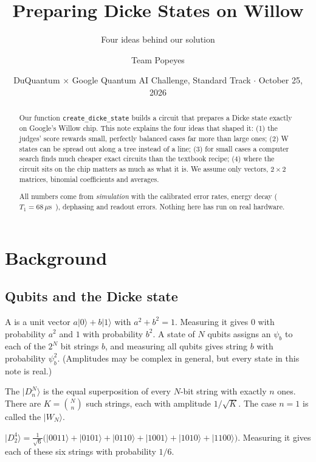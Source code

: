 \documentclass[11pt]{scrartcl}
\title{Preparing Dicke States on Willow}
\subtitle{Four ideas behind our solution}
\author{Team Popeyes}
\date{DuQuantum $\times$ Google Quantum AI Challenge, Standard Track $\cdot$ October 25, 2026}
\newcommand{\ket}[1]{\lvert #1\rangle}
\newcommand{\D}[2]{D^{#1}_{#2}}
\newcommand{\file}[1]{\texttt{\small #1}}
\begin{document}
\maketitle

\begin{abstract}
  Our function \file{create\_dicke\_state} builds a circuit that prepares a Dicke state exactly on
  Google's Willow chip. This note explains the four ideas that shaped it: (1) the judges' score
  rewards small, perfectly balanced cases far more than large ones; (2) W states can be spread out
  along a tree instead of a line; (3) for small cases a computer search finds much cheaper exact
  circuits than the textbook recipe; (4) where the circuit sits on the chip matters as much as what it
  is. We assume only vectors, $2\times2$ matrices, binomial coefficients and averages.

  All numbers come from \emph{simulation} with the calibrated error rates, energy decay
  ($T_1=68\,\mu$s~\cite{willow}), dephasing and readout errors. Nothing here has run on real hardware.
\end{abstract}

\section{Background}

\subsection{Qubits and the Dicke state}

A  is a unit vector $a\ket0+b\ket1$ with $a^2+b^2=1$. Measuring it gives $0$ with
probability $a^2$ and $1$ with probability $b^2$. A state of $N$ qubits assigns an
 $\psi_b$ to each of the $2^N$ bit strings $b$, and measuring all qubits gives
string $b$ with probability $\psi_b^2$. (Amplitudes may be complex in general, but every state in
this note is real.)

\begin{definition}
  The  $\ket{\D Nn}$ is the equal superposition of every $N$-bit string with
  exactly $n$ ones. There are $K=\binom Nn$ such strings, each with amplitude $1/\sqrt K$. The case
  $n=1$ is called the  $\ket{W_N}$.
\end{definition}

\begin{example}[$\D42$]
  $\ket{\D42}=\tfrac{1}{\sqrt6}\bigl(\ket{0011}+\ket{0101}+\ket{0110}+\ket{1001}+\ket{1010}+\ket{1100}\bigr)$.
  Measuring it gives each of these six strings with probability $1/6$.
\end{example}
\end{document}
